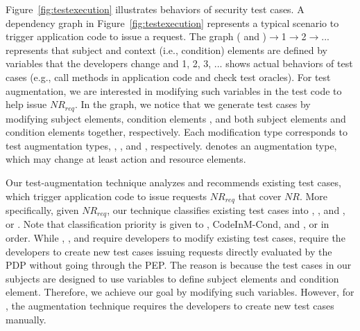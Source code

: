Figure~\ref{fig:testexecution} illustrates behaviors of security test cases.
A dependency graph in Figure~\ref{fig:testexecution} represents a typical
scenario to trigger application code to issue a request.
The graph ( and )$\rightarrow$1$\rightarrow$2$\rightarrow$...
represents that subject and context (i.e., condition) elements are defined by variables that
the developers change and 1, 2, 3, ... shows actual behaviors of test cases (e.g., call methods in application
code and check test oracles).
For test augmentation, we are interested in modifying such variables in the test code
to help issue $NR_{req}$.
In the graph, we notice that we generate test cases by modifying
subject elements, condition elements , and both subject elements and condition elements together, respectively.
Each modification type corresponds to test augmentation types, , , and , respectively.
 denotes an augmentation type, which
may change at least action and resource elements.

Our test-augmentation technique analyzes and recommends existing test cases, which trigger
application code to issue requests $NR_{req}$ that cover $NR$.
More specifically, given $NR_{req}$, our technique classifies existing test cases into , , and ,
or . Note that classification priority is given to , CodeIn{M-Cond}, and ,
or  in order.
While , , and  require developers to modify existing
test cases,  require the developers to create new test cases issuing requests
directly evaluated by the PDP without going through the PEP. The reason is because the test cases in our subjects are
designed to use variables to define subject elements and condition element. Therefore,
we achieve our goal by modifying such variables. However, for , the augmentation technique requires the
developers to create new test cases manually.

 

